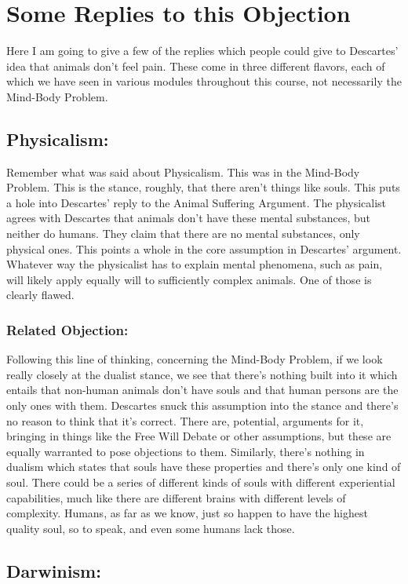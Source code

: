 \section{Some Replies to this Objection}

Here I am going to give a few of the replies which people could give to Descartes' idea that animals don't feel pain. These come in three different flavors, each of which we have seen in various modules throughout this course, not necessarily the Mind-Body Problem.
\subsection{Physicalism:}

Remember what was said about Physicalism. This was in the Mind-Body Problem. This is the stance, roughly, that there aren't things like souls. This puts a hole into Descartes' reply to the Animal Suffering Argument. The physicalist agrees with Descartes that animals don't have these mental substances, but neither do humans. They claim that there are no mental substances, only physical ones. This points a whole in the core assumption in Descartes' argument. Whatever way the physicalist has to explain mental phenomena, such as pain, will likely apply equally will to sufficiently complex animals.  One of those is clearly flawed.
\subsubsection{Related Objection:}

Following this line of thinking, concerning the Mind-Body Problem, if we look really closely at the dualist stance, we see that there's nothing built into it which entails that non-human animals don't have souls and that human persons are the only ones with them. Descartes snuck this assumption into the stance and there's no reason to think that it's correct. There are, potential, arguments for it, bringing in things like the Free Will Debate or other assumptions, but these are equally warranted to pose objections to them. Similarly, there's nothing in dualism which states that souls have these properties and there's only one kind of soul. There could be a series of different kinds of souls with different experiential capabilities, much like there are different brains with different levels of complexity. Humans, as far as we know, just so happen to have the highest quality soul, so to speak, and even some humans lack those. 
\subsection{Darwinism:}

